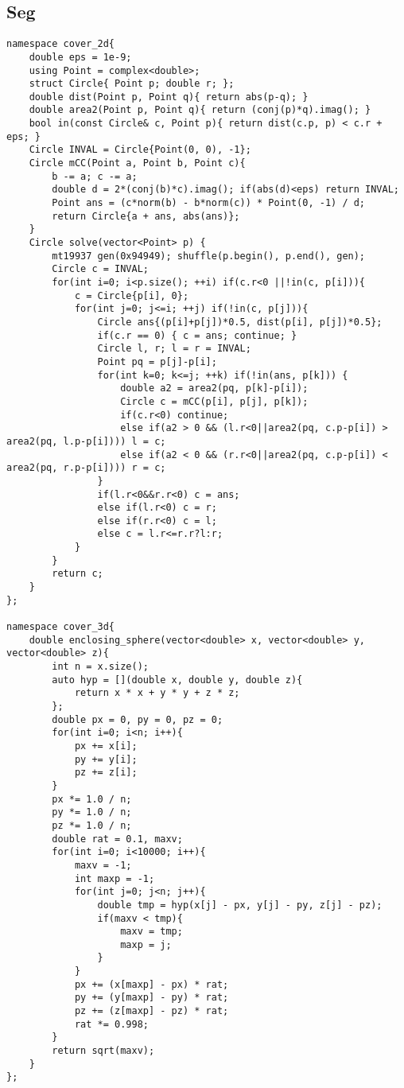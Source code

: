 \documentclass[landscape, 8pt, a4paper, oneside, twocolumn]{extarticle}
\begin{document}
\subsection{Seg}
\begin{verbatim}
namespace cover_2d{
	double eps = 1e-9;
	using Point = complex<double>;
	struct Circle{ Point p; double r; };
	double dist(Point p, Point q){ return abs(p-q); }
	double area2(Point p, Point q){ return (conj(p)*q).imag(); }
	bool in(const Circle& c, Point p){ return dist(c.p, p) < c.r + eps; }
	Circle INVAL = Circle{Point(0, 0), -1};
	Circle mCC(Point a, Point b, Point c){
		b -= a; c -= a;
		double d = 2*(conj(b)*c).imag(); if(abs(d)<eps) return INVAL;
		Point ans = (c*norm(b) - b*norm(c)) * Point(0, -1) / d;
		return Circle{a + ans, abs(ans)};
	}
	Circle solve(vector<Point> p) {
		mt19937 gen(0x94949); shuffle(p.begin(), p.end(), gen);
		Circle c = INVAL;
		for(int i=0; i<p.size(); ++i) if(c.r<0 ||!in(c, p[i])){
			c = Circle{p[i], 0};
			for(int j=0; j<=i; ++j) if(!in(c, p[j])){
				Circle ans{(p[i]+p[j])*0.5, dist(p[i], p[j])*0.5};
				if(c.r == 0) { c = ans; continue; }
				Circle l, r; l = r = INVAL;
				Point pq = p[j]-p[i];
				for(int k=0; k<=j; ++k) if(!in(ans, p[k])) {
					double a2 = area2(pq, p[k]-p[i]);
					Circle c = mCC(p[i], p[j], p[k]);
					if(c.r<0) continue;
					else if(a2 > 0 && (l.r<0||area2(pq, c.p-p[i]) > area2(pq, l.p-p[i]))) l = c;
					else if(a2 < 0 && (r.r<0||area2(pq, c.p-p[i]) < area2(pq, r.p-p[i]))) r = c;
				}
				if(l.r<0&&r.r<0) c = ans;
				else if(l.r<0) c = r;
				else if(r.r<0) c = l;
				else c = l.r<=r.r?l:r;
			}
		}
		return c;
	}
};

namespace cover_3d{
	double enclosing_sphere(vector<double> x, vector<double> y, vector<double> z){
		int n = x.size();
		auto hyp = [](double x, double y, double z){
			return x * x + y * y + z * z;
		};
		double px = 0, py = 0, pz = 0;
		for(int i=0; i<n; i++){
			px += x[i];
			py += y[i];
			pz += z[i];
		}
		px *= 1.0 / n;
		py *= 1.0 / n;
		pz *= 1.0 / n;
		double rat = 0.1, maxv;
		for(int i=0; i<10000; i++){
			maxv = -1;
			int maxp = -1;
			for(int j=0; j<n; j++){
				double tmp = hyp(x[j] - px, y[j] - py, z[j] - pz);
				if(maxv < tmp){
					maxv = tmp;
					maxp = j;
				}
			}
			px += (x[maxp] - px) * rat;
			py += (y[maxp] - py) * rat;
			pz += (z[maxp] - pz) * rat;
			rat *= 0.998;
		}
		return sqrt(maxv);
	}
};
\end{verbatim}
\end{document}
